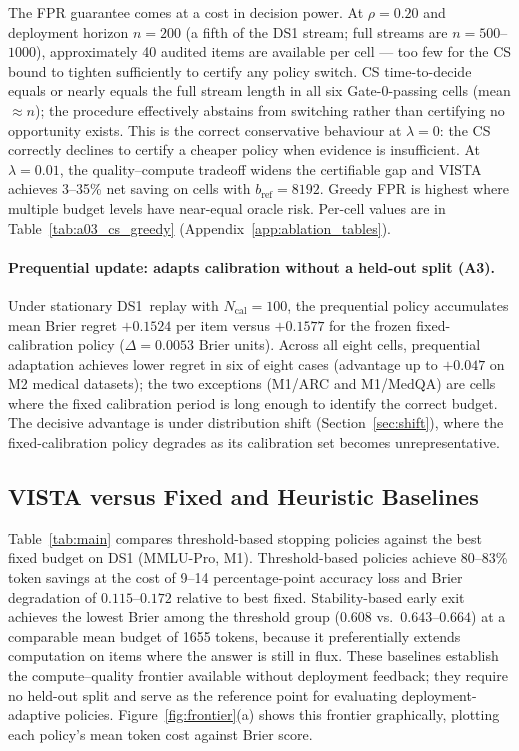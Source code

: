 \documentclass[a4paper,fleqn]{cas-sc}
\theoremstyle{plain}
\theoremstyle{definition}
\theoremstyle{remark}
\begin{document}
The FPR guarantee comes at a cost in decision power.
At $\rho{=}0.20$ and deployment horizon $n{=}200$ (a fifth of the DS1 stream;
full streams are $n{=}500$--$1000$), approximately 40 audited items are
available per cell --- too few for the CS bound to tighten sufficiently
to certify any policy switch.
CS time-to-decide equals or nearly equals the full stream length in all six
Gate-0-passing cells (mean $\approx n$); the procedure effectively abstains from
switching rather than certifying no opportunity exists.
This is the correct conservative behaviour at $\lambda{=}0$: the CS correctly
declines to certify a cheaper policy when evidence is insufficient.
At $\lambda{=}0.01$, the quality--compute tradeoff widens the certifiable gap and
VISTA achieves 3--35\% net saving on cells with $b_{\mathrm{ref}}{=}8192$.
Greedy FPR is highest where multiple budget levels have near-equal oracle risk.
Per-cell values are in Table~\ref{tab:a03_cs_greedy}
(Appendix~\ref{app:ablation_tables}).

\paragraph{Prequential update: adapts calibration without a held-out split (A3).}
Under stationary DS1~replay with $N_\text{cal}=100$, the prequential policy
accumulates mean Brier regret $+0.1524$ per item versus $+0.1577$ for the
frozen fixed-calibration policy ($\Delta=0.0053$ Brier units).
Across all eight cells, prequential adaptation achieves lower regret in six
of eight cases (advantage up to $+0.047$ on M2 medical datasets); the two
exceptions (M1/ARC and M1/MedQA) are cells where the fixed calibration period
is long enough to identify the correct budget.
The decisive advantage is under distribution shift
(Section~\ref{sec:shift}), where the fixed-calibration policy degrades as its
calibration set becomes unrepresentative.

\subsection{VISTA versus Fixed and Heuristic Baselines}
\label{sec:baselines}

Table~\ref{tab:main} compares threshold-based stopping policies against the
best fixed budget on DS1 (MMLU-Pro, M1).
Threshold-based policies achieve 80--83\% token savings at the cost of
9--14 percentage-point accuracy loss and Brier degradation of $0.115$--$0.172$
relative to best fixed.
Stability-based early exit achieves the lowest Brier among the threshold
group ($0.608$ vs.\ $0.643$--$0.664$) at a comparable mean budget of
1655 tokens, because it preferentially extends computation on items where the
answer is still in flux.
These baselines establish the compute--quality frontier available without
deployment feedback; they require no held-out split and serve as the reference
point for evaluating deployment-adaptive policies.
Figure~\ref{fig:frontier}(a) shows this frontier graphically, plotting each
policy's mean token cost against Brier score.
\end{document}
